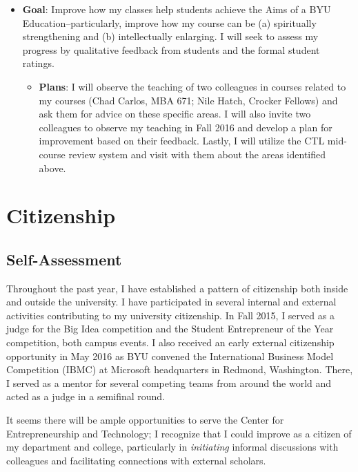 \documentclass[11pt,article,oneside]{memoir}
\begin{document}
\begin{itemize}
\tightlist
\item
  \textbf{Goal}: Improve how my classes help students achieve the Aims
  of a BYU Education--particularly, improve how my course can be (a)
  spiritually strengthening and (b) intellectually enlarging. I will
  seek to assess my progress by qualitative feedback from students and
  the formal student ratings.

  \begin{itemize}
  \tightlist
  \item
    \textbf{Plans}: I will observe the teaching of two colleagues in
    courses related to my courses (Chad Carlos, MBA 671; Nile Hatch,
    Crocker Fellows) and ask them for advice on these specific areas. I
    will also invite two colleagues to observe my teaching in Fall 2016
    and develop a plan for improvement based on their feedback. Lastly,
    I will utilize the CTL mid-course review system and visit with them
    about the areas identified above.
  \end{itemize}
\end{itemize}

\section{Citizenship}\label{citizenship}

\subsection{Self-Assessment}\label{self-assessment-2}

Throughout the past year, I have established a pattern of citizenship
both inside and outside the university. I have participated in several
internal and external activities contributing to my university
citizenship. In Fall 2015, I served as a judge for the Big Idea
competition and the Student Entrepreneur of the Year competition, both
campus events. I also received an early external citizenship opportunity
in May 2016 as BYU convened the International Business Model Competition
(IBMC) at Microsoft headquarters in Redmond, Washington. There, I served
as a mentor for several competing teams from around the world and acted
as a judge in a semifinal round.

It seems there will be ample opportunities to serve the Center for
Entrepreneurship and Technology; I recognize that I could improve as a
citizen of my department and college, particularly in \emph{initiating}
informal discussions with colleagues and facilitating connections with
external scholars.
\end{document}
